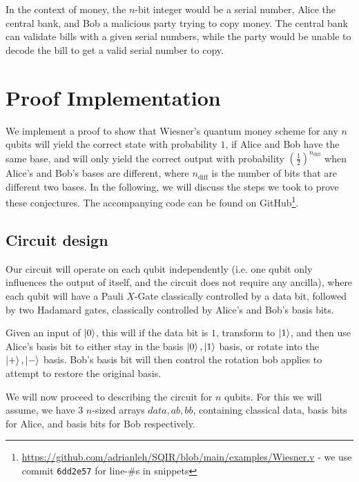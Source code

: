 \documentclass{article}
\begin{document}
In the context of money, the $n$-bit integer would be a serial number, Alice the central bank, and Bob a malicious  party trying to copy money.
The central bank can validate bills with a given serial numbers, while the  party would be unable to decode the bill to get a valid serial number to copy.

\section{Proof Implementation}\label{sec:proof-impl}
We implement a proof to show that Wiesner's quantum money scheme for any $n$ qubits will yield the correct state with probability $1$, if Alice and Bob have the same base, and will only yield the correct output with probability $(\frac{1}{2})^{n_{\text{diff}}}$ when Alice's and Bob's bases are different, where $n_{\text{diff}}$ is the number of bits that are different two bases. In the following, we will discuss the steps we took to prove these conjectures. The accompanying code can be found on GitHub\footnote{\url{https://github.com/adrianleh/SQIR/blob/main/examples/Wiesner.v} - we use commit \texttt{6dd2e57} for line-\#s in snippets}.

\subsection{Circuit design}

Our circuit will operate on each qubit independently (i.e. one qubit only influences the output of itself, and the circuit does not require any ancilla), where each qubit will have a Pauli $X$-Gate classically controlled by a data bit, followed by two Hadamard gates, classically controlled by Alice's and Bob's basis bits.

Given an input of $\ket{0}$, this will if the data bit is $1$, transform to $\ket{1}$, and then use Alice's basis bit to either stay in the basis $\ket{0},\ket{1}$ basis, or rotate into the $\ket{+},\ket{-}$ basis. 
Bob's basis bit will then control the rotation bob applies to attempt to restore the original basis.

We will now proceed to describing the circuit for $n$ qubits. 
For this we will assume, we have $3$ $n$-sized arrays $data, ab, bb$, containing classical data, basis bits for Alice, and basis bits for Bob respectively.
\end{document}
